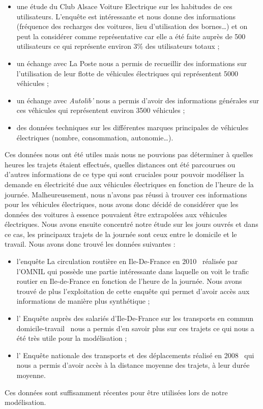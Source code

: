 		\begin{itemize}
			\item une étude du Club Alsace Voiture Electrique sur les habitudes de ces utilisateurs. L’enquête est intéressante et nous donne des informations (fréquence des recharges des voitures, lieu d’utilisation des bornes…) et on peut la considérer comme représentative car elle a été faite auprès de 500 utilisateurs ce qui représente environ 3\% des utilisateurs totaux ;
			\item un échange avec La Poste nous a permis de recueillir des informations sur l’utilisation de leur flotte de véhicules électriques qui représentent 5000 véhicules ;
			\item un échange avec \textit{Autolib’} nous a permis d’avoir des informations générales sur ces véhicules qui représentent environ 3500 véhicules ;
			\item des données techniques sur les différentes marques principales de véhicules électriques (nombre, consommation, autonomie…).
		\end{itemize}
		
		Ces données nous ont été utiles mais nous ne pouvions pas déterminer à quelles heures les trajets étaient effectués, quelles distances ont été parcourues ou d’autres informations de ce type qui sont cruciales pour pouvoir modéliser la demande en électricité due aux véhicules électriques en fonction de l’heure de la journée. Malheureusement, nous n’avons pas réussi à trouver ces informations pour les véhicules électriques, nous avons donc décidé de considérer que les données des voitures à essence pouvaient être extrapolées aux véhicules électriques. Nous avons ensuite concentré notre étude sur les jours ouvrés et dans ce cas, les principaux trajets de la journée sont ceux entre le domicile et le travail. Nous avons donc trouvé les données suivantes :
		
		\begin{itemize}
			\item l’enquête \og La circulation routière en Ile-De-France en 2010 \fg~réalisée par l’OMNIL qui possède une partie intéressante dans laquelle on voit le trafic routier en Ile-de-France en fonction de l’heure de la journée. Nous avons trouvé de plus l’exploitation de cette enquête qui permet d’avoir accès aux informations de manière plus synthétique ;
			\item l’ \og Enquête auprès des salariés d’Ile-De-France sur les transports en commun domicile-travail \fg~nous a permis d’en savoir plus sur ces trajets ce qui nous a  été très utile pour la modélisation ;
			\item l’ \og Enquête nationale des transports et des déplacements réalisé en 2008 \fg~qui nous a permis d’avoir accès à la distance moyenne des trajets, à leur durée moyenne.
		\end{itemize}
		
		Ces données sont suffisamment récentes pour être utilisées lors de notre modélisation.